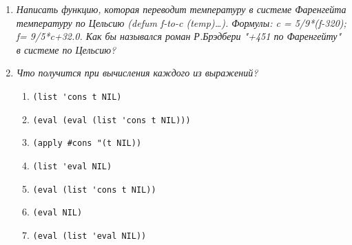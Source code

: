\begin{enumerate}[wide=0pt]
\begin{enumerate}[label=\arabic*)]
	
\end{enumerate}

\item \textit{Написать функцию, которая переводит температуру в системе Фаренгейта
температуру по Цельсию (defum f-to-c (temp)…).
Формулы: 	c = 5/9*(f-320); 	f= 9/5*c+32.0. 
Как бы назывался роман Р.Брэдбери "+451 по Фаренгейту" в системе по Цельсию?}

\item \textit{Что получится при вычисления каждого из выражений?}


\begin{enumerate}[label=\arabic*)]
	\item \lstinline {(list 'cons t NIL)}
	\item \lstinline {(eval (eval (list 'cons t NIL)))}
	\item \lstinline {(apply #cons "(t NIL))}
	\item \lstinline {(list 'eval NIL)}
	\item \lstinline {(eval (list 'cons t NIL))}
	\item \lstinline {(eval NIL)}
	\item \lstinline {(eval (list 'eval NIL))}

	
\end{enumerate}

\end{enumerate}